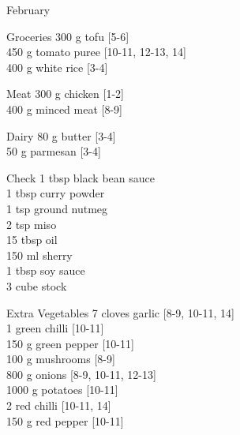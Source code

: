 \begin{menu}{February}
\begin{shoppinglist}{Groceries}
      300 g tofu {\scriptsize[5-6]}\\
      450 g tomato puree {\scriptsize[10-11, 12-13, 14]}\\
      400 g white rice {\scriptsize[3-4]}\\
      \end{shoppinglist}%
      \par\vfil %
      \begin{shoppinglist}{Meat}
      300 g chicken {\scriptsize[1-2]}\\
      400 g minced meat {\scriptsize[8-9]}\\
      \end{shoppinglist}%
      \begin{shoppinglist}{Dairy}
      80 g butter {\scriptsize[3-4]}\\
      50 g parmesan {\scriptsize[3-4]}\\
      \end{shoppinglist}%
      \par\vfil %
      \vfil\clearpage %
      \begin{shoppinglist}{Check}
      1 tbsp black bean sauce \\
      1 tbsp curry powder \\
      1 tsp ground nutmeg \\
      2 tsp miso \\
      15 tbsp oil \\
      150 ml sherry \\
      1 tbsp soy sauce \\
      3 cube stock \\
      \end{shoppinglist}%
      \begin{shoppinglist}{Extra Vegetables}
      7 cloves garlic {\scriptsize[8-9, 10-11, 14]}\\
      1  green chilli {\scriptsize[10-11]}\\
      150 g green pepper {\scriptsize[10-11]}\\
      100 g mushrooms {\scriptsize[8-9]}\\
      800 g onions {\scriptsize[8-9, 10-11, 12-13]}\\
      1000 g potatoes {\scriptsize[10-11]}\\
      2  red chilli {\scriptsize[10-11, 14]}\\
      150 g red pepper {\scriptsize[10-11]}\\
      \end{shoppinglist}%
      \par\vfil %
    \vfil\clearpage
  

\end{menu}
